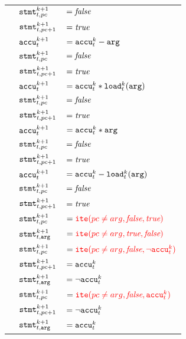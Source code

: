 \begin{longtabu}{llX[m]}
    & $\texttt{stmt}^{k + 1}_{t, pc}$     & $= \textit{false}$ \\
    & $\texttt{stmt}^{k + 1}_{t, pc + 1}$ & $= \textit{true}$ \\
  \hline
    & $\texttt{accu}^{k + 1}_t$           & $= \texttt{accu}^k_t - \texttt{arg}$ \\
    & $\texttt{stmt}^{k + 1}_{t, pc}$     & $= \textit{false}$ \\
    & $\texttt{stmt}^{k + 1}_{t, pc + 1}$ & $= \textit{true}$ \\
  \hline
    & $\texttt{accu}^{k + 1}_t$           & $= \texttt{accu}^k_t * \texttt{load}^k_t(\texttt{arg})$ \\
    & $\texttt{stmt}^{k + 1}_{t, pc}$     & $= \textit{false}$ \\
    & $\texttt{stmt}^{k + 1}_{t, pc + 1}$ & $= \textit{true}$ \\
  \hline
    & $\texttt{accu}^{k + 1}_t$           & $= \texttt{accu}^k_t * \texttt{arg}$ \\
    & $\texttt{stmt}^{k + 1}_{t, pc}$     & $= \textit{false}$ \\
    & $\texttt{stmt}^{k + 1}_{t, pc + 1}$ & $= \textit{true}$ \\
  \hline
    & $\texttt{accu}^{k + 1}_t$           & $= \texttt{accu}^k_t - \texttt{load}^k_t(\texttt{arg})$ \\
    & $\texttt{stmt}^{k + 1}_{t, pc}$     & $= \textit{false}$ \\
    & $\texttt{stmt}^{k + 1}_{t, pc + 1}$ & $= \textit{true}$ \\
  \hline
    & $\texttt{stmt}^{k + 1}_{t, pc}$           & $= {\color{red}\texttt{ite}(pc \neq arg, \textit{false}, \textit{true})}$ \\
    & $\texttt{stmt}^{k + 1}_{t, \texttt{arg}}$ & $= {\color{red}\texttt{ite}(pc \neq arg, \textit{true}, \textit{false})}$ \\
  \hline
    & $\texttt{stmt}^{k + 1}_{t, pc}$           & $= {\color{red}\texttt{ite}(pc \neq arg, \textit{false}, \lnot \texttt{accu}^k_t)}$ \\
    & $\texttt{stmt}^{k + 1}_{t, pc + 1}$       & $= \texttt{accu}^k_t$ \\
    & $\texttt{stmt}^{k + 1}_{t, \texttt{arg}}$ & $= \lnot \texttt{accu}^k_t$ \\
  \hline
    & $\texttt{stmt}^{k + 1}_{t, pc}$           & $= {\color{red}\texttt{ite}(pc \neq arg, \textit{false}, \texttt{accu}^k_t)}$ \\
    & $\texttt{stmt}^{k + 1}_{t, pc + 1}$       & $= \lnot \texttt{accu}^k_t$ \\
    & $\texttt{stmt}^{k + 1}_{t, \texttt{arg}}$ & $= \texttt{accu}^k_t$ \\

\end{longtabu}

